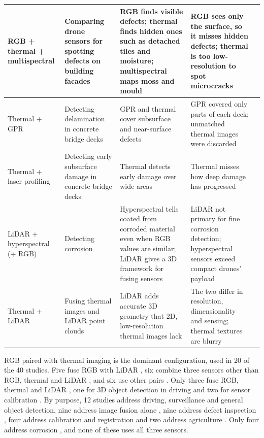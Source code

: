 {\begin{xltabular}{\textwidth}{>{\RaggedRight\arraybackslash}p{2.1cm}>{\RaggedRight\arraybackslash}p{2.9cm}>{\RaggedRight\arraybackslash}X>{\RaggedRight\arraybackslash}Xp{0.95cm}}
\midrule
RGB + thermal + multispectral & Comparing drone sensors for spotting defects on building facades & RGB finds visible defects; thermal finds hidden ones such as detached tiles and moisture; multispectral maps moss and mould & RGB sees only the surface, so it misses hidden defects; thermal is too low-resolution to spot microcracks & \citep{Guedes2025} \\
\midrule
Thermal + GPR & Detecting delamination in concrete bridge decks & GPR and thermal cover subsurface and near-surface defects & GPR covered only parts of each deck; unmatched thermal images were discarded & \citep{Rashidi2026} \\
\midrule
Thermal + laser profiling & Detecting early subsurface damage in concrete bridge decks & Thermal detects early damage over wide areas & Thermal misses how deep damage has progressed & \citep{Yamashita2025} \\
\midrule
LiDAR + hyperspectral (+ RGB) & Detecting corrosion & Hyperspectral tells coated from corroded material even when RGB values are similar; LiDAR gives a 3D framework for fusing sensors & LiDAR not primary for fine corrosion detection; hyperspectral sensors exceed compact drones' payload & \citep{PallasEnguita2025} \\
\midrule
Thermal + LiDAR & Fusing thermal images and LiDAR point clouds & LiDAR adds accurate 3D geometry that 2D, low-resolution thermal images lack & The two differ in resolution, dimensionality and sensing; thermal textures are blurry & \citep{Zhu2026a} \\
\end{xltabular}
}


RGB paired with thermal imaging is the dominant configuration, used in 20 of the
40 studies. Five fuse RGB with LiDAR \citep{Cheng2025,Zhang2026d,Maru2025,PimenteldeFigueiredo2025,Tang2025}, six combine three
sensors other than RGB, thermal and LiDAR \citep{Wu2025,Cao2026,Nooralishahi2022,Laidouni2025,Guedes2025,PallasEnguita2025}, and
six use other pairs \citep{Byeon2026,Asad2026,Gunatilake2021,Rashidi2026,Yamashita2025,Zhu2026a}. Only three fuse RGB,
thermal and LiDAR \citep{Tran2025,Tran2024,Yang2024}, one for 3D object detection in driving \citep{Tran2025}
and two for sensor calibration \citep{Tran2024,Yang2024}. By purpose, 12 studies address
driving, surveillance and general object detection, nine address image fusion
alone \citep{Gao2026,Lin2026,Zhu2026,Xiao2026,Xu2026,Chen2026a,An2026,Zhou2026,Laidouni2025}, nine address defect inspection
\citep{Asad2026,Gunatilake2021,Shahsavarani2024,Yang2023,Li2024c,Rashidi2026,Yamashita2025,Nooralishahi2022,Guedes2025}, four address calibration and
registration \citep{Bin2023,Yang2024,Tran2024,Zhu2026a} and two address agriculture \citep{Tang2025,Cao2026}. Only
four address corrosion \citep{Lim2021,Maru2025,PimenteldeFigueiredo2025,PallasEnguita2025}, and none of these uses all three
sensors.

